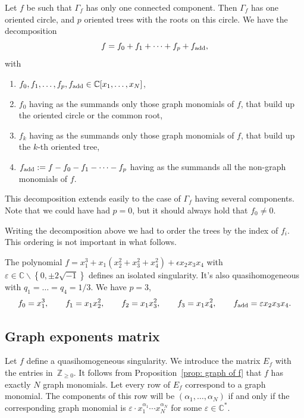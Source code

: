 \documentclass[10pt,a4paper]{amsart}
\numberwithin{equation}{section}
\newcommand{\CC}{{\mathbb{C}}}
\newcommand{\ZZ}{{\mathbb{Z}}}
\newcommand{\eps}{\varepsilon}
\begin{document}
Let $f$ be such that $\Gamma_f$ has only one connected component. Then $\Gamma_f$ has one oriented circle, and $p$ oriented trees with the roots on this circle.
We have the decomposition
\begin{equation}\label{eq: f decomposition}
	f = f_0 + f_1 + \dots + f_p + f_{\rm add},
\end{equation}
with
\begin{enumerate}\itemsep=0pt
 \item[(1)] $f_0,f_1,\dots,f_p, f_{\rm add} \in \CC[x_1,\dots,x_N]$,
 \item[(2)] $f_0$ having as the summands only those graph monomials of $f$, that build up the oriented circle or the common root,
 \item[(3)] $f_k$ having as the summands only those graph monomials of $f$, that build up the $k$-th oriented tree,
 \item[(4)] $f_{\rm add} := f - f_0 - f_1 -\dots - f_p$ having as the summands all the non-graph monomials of $f$.
\end{enumerate}
This decomposition extends easily to the case of $\Gamma_f$ having several components. Note that we could have had $p=0$, but it should always hold that $f_0 \neq 0$.

Writing the decomposition above we had to order the trees by the index of $f_i$. This ordering is not important in what follows.

\begin{Example}
	The polynomial $f = x_1^3 + x_1 \left(x_2^2+x_3^2+x_4^2\right) + \epsilon x_2 x_3 x_4 $ with $\eps \in \CC \backslash \left\lbrace 0, \pm 2 \sqrt{-1}\right\rbrace$ defines an isolated singularity. It's also quasihomogeneous with $q_1=\dots=q_4=1/3$.
	We have $p = 3$,
	\[
		f_0 = x_1^3, \qquad f_1 = x_1 x_2^2, \qquad f_2 = x_1 x_3^2, \qquad f_3 = x_1 x_4^2, \qquad f_{\rm add} = \eps x_2x_3x_4.
	\]
\end{Example}

\subsection{Graph exponents matrix}
Let $f$ define a quasihomogeneous singularity. We introduce the matrix $E_f$ with the entries in~$\ZZ_{\ge 0}$. It follows from Proposition~\ref{prop: graph of f} that $f$ has exactly $N$ graph monomials. Let every row of $E_f$ correspond to a graph monomial. The components of this row will be $(\alpha_1,\dots,\alpha_N)$ if and only if the corresponding graph monomial is $\eps \cdot x_1^{\alpha_1} \cdots x_N^{\alpha_N}$ for some $\eps \in \CC^\ast$.
\end{document}
